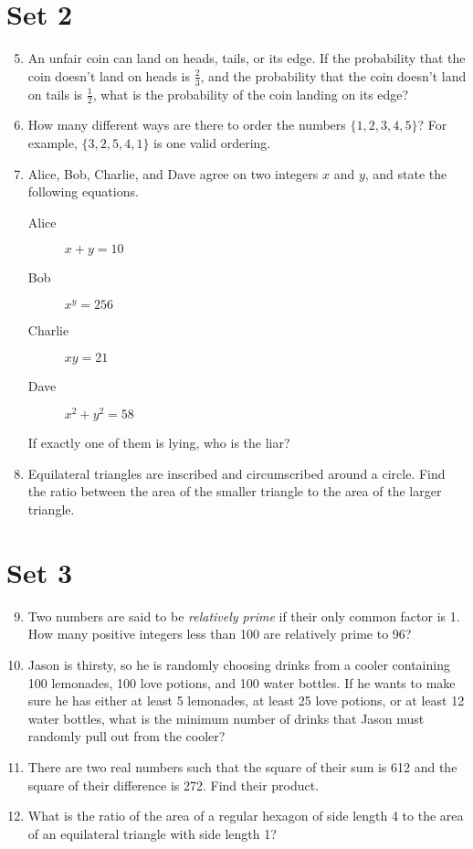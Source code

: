 \documentclass[11pt]{article}
\theoremstyle{definition}
\begin{document}
\section*{Set 2}
\begin{enumerate}
\setcounter{enumi}{4}
\item An unfair coin can land on heads, tails, or its edge. If the probability that the coin doesn’t land on heads is $\frac{2}{3}$, and the probability that the coin doesn’t land on tails is $\frac{1}{2}$, what is the probability of the coin landing on its edge?
\item How many different ways are there to order the numbers $\{1,2,3,4,5\}$? For example, $\{3,2,5,4,1\}$ is one valid ordering.
\item Alice, Bob, Charlie, and Dave agree on two integers $x$ and $y$, and state the following equations. %
\begin{description}
\item[Alice] $x + y = 10$
\item[Bob] $x^y = 256$
\item[Charlie] $xy = 21$
\item[Dave] $x^2 + y^2 = 58$
\end{description}
If exactly one of them is lying, who is the liar?
\item Equilateral triangles are inscribed and circumscribed around a circle. Find the ratio between the area of the smaller triangle to the area of the larger triangle.
\end{enumerate}

\eject
\section*{Set 3}
\begin{enumerate}
\setcounter{enumi}{8}

\item Two numbers are said to be \emph{relatively prime} if their only common factor is 1. How many positive integers less than 100 are relatively prime to 96? %
\item Jason is thirsty, so he is randomly choosing drinks from a cooler containing 100 lemonades, 100 love potions, and 100 water bottles. If he wants to make sure he has either at least 5 lemonades, at least 25 love potions, or at least 12 water bottles, what is the minimum number of drinks that Jason must randomly pull out from the cooler?
\item There are two real numbers such that the square of their sum is 612 and the square of their difference is 272. Find their product.
\item What is the ratio of the area of a regular hexagon of side length 4 to the area of an equilateral triangle with side length 1? %
\end{enumerate}
\end{document}
